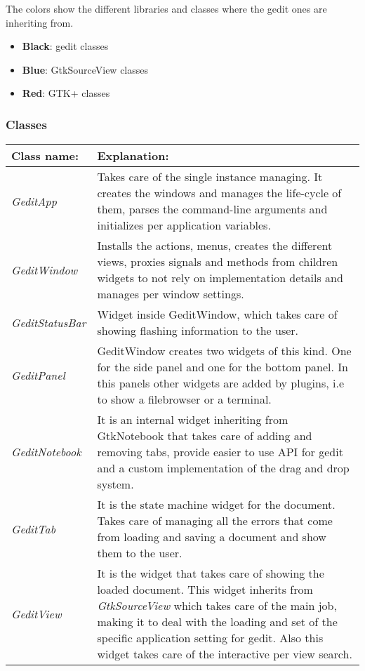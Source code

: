 The colors show the different libraries and classes where the gedit ones are inheriting from.
\begin{itemize}
  \item \textbf{Black}: gedit classes
  \item \textbf{Blue}: GtkSourceView classes
  \item \textbf{Red}: GTK+ classes
\end{itemize}

\newpage
\subsubsection{Classes}

\begin{table}[H]
  \begin{center}
    \begin{tabularx}{\textwidth}{|l|X|}
      \firsthline
      \textbf{Class name:} & \textbf{Explanation:} \\
      \hline
      \textit{GeditApp} & Takes care of the single instance managing. It creates the windows and manages the life-cycle of them, parses the command-line arguments and initializes per application variables. \\
      \hline
      \textit{GeditWindow} & Installs the actions, menus, creates the different views, proxies signals and methods from children widgets to not rely on implementation details and manages per window settings. \\
      \hline
      \textit{GeditStatusBar} & Widget inside GeditWindow, which takes care of showing flashing information to the user. \\
      \hline
      \textit{GeditPanel} & GeditWindow creates two widgets of this kind. One for the side panel and one for the bottom panel. In this panels other widgets are added by plugins, i.e to show a filebrowser or a terminal. \\
      \hline
      \textit{GeditNotebook} & It is an internal widget inheriting from GtkNotebook that takes care of adding and removing tabs, provide easier to use API for gedit and a custom implementation of the drag and drop system. \\
      \hline
      \textit{GeditTab} & It is the state machine widget for the document. Takes care of managing all the errors that come from loading and saving a document and show them to the user. \\
      \hline
      \textit{GeditView} & It is the widget that takes care of showing the loaded document. This widget inherits from \emph{GtkSourceView} which takes care of the main job, making it to deal with the loading and set of the specific application setting for gedit. Also this widget takes care of the interactive per view search. \\

\end{tabularx}
\end{center}
\end{table}
